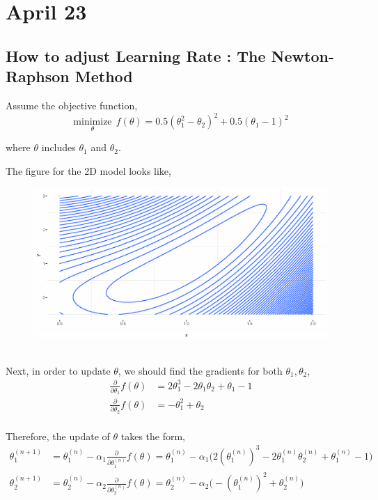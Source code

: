 \documentclass[12pt,a4paper]{article}%
\theoremstyle{definition}
\theoremstyle{plain}
\numberwithin{equation}{section}
\begin{document}
\section{April 23}
\subsection{How to adjust Learning Rate : The Newton-Raphson Method}

Assume the objective function,
\begin{equation}
\underset{\theta}{\text{minimize}}~~ f(\theta) = 0.5(\theta_{1}^{2}-\theta_{2})^{2} + 0.5(\theta_{1}-1)^{2}
\end{equation}

where $\theta$ includes $\theta_{1}$ and $\theta_{2}$.

The figure for the 2D model looks like,
\begin{figure}[H]
\centering
{}
\includegraphics[scale=0.8]{images//plot.eps}
\\~\\
\end{figure}


Next, in order to update $\theta$, we should find the gradients for both $\theta_{1},\theta_{2}$, 
\begin{align*}
\frac{\partial}{\partial \theta_{1}}f(\theta) &= 2\theta_{1}^{3} - 2 \theta_{1} \theta_{2} + \theta_{1} -1 \\
\frac{\partial}{\partial \theta_{2}}f(\theta) &=  - \theta_{1}^{2} + \theta_{2} \\
\end{align*}

Therefore, the update of $\theta$ takes the form,
\begin{align*}
\theta_{1}^{(n+1)} &= \theta_{1}^{(n)} - \alpha_{1} \frac{\partial}{\partial \theta_{1}^{(n)}}f(\theta)= \theta_{1}^{(n)} - \alpha_{1} \big( 2(\theta_{1}^{(n)})^{3} - 2 \theta_{1}^{(n)} \theta_{2}^{(n)} + \theta_{1}^{(n)} -1 \big)   \\
\theta_{2}^{(n+1)} &= \theta_{2}^{(n)} - \alpha_{2} \frac{\partial}{\partial \theta_{2}^{(n)}}f(\theta)= \theta_{2}^{(n)} - \alpha_{2} \big( - (\theta_{1}^{(n)})^{2} + \theta_{2}^{(n)} \big)
\end{align*}
\end{document}
